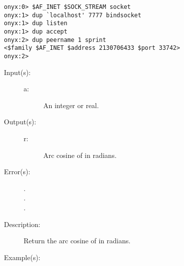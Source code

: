 \begin{description}
\begin{description}
\begin{verbatim}
onyx:0> $AF_INET $SOCK_STREAM socket
onyx:1> dup `localhost' 7777 bindsocket
onyx:1> dup listen
onyx:1> dup accept
onyx:2> dup peername 1 sprint
<$family $AF_INET $address 2130706433 $port 33742>
onyx:2>
		\end{verbatim}
	\end{description}
\label{systemdict:acos}
\item[{\onyxop{a}{acos}{r}}: ]
	\begin{description}\item[]
	\item[Input(s): ]
		\begin{description}\item[]
		\item[a: ]
			An integer or real.
		\end{description}
	\item[Output(s): ]
		\begin{description}\item[]
		\item[r: ]
			Arc cosine of  in radians.
		\end{description}
	\item[Error(s): ]
		\begin{description}\item[]
		\item[.]
		\item[.]
		\item[.]
		\end{description}
	\item[Description: ]
		Return the arc cosine of  in radians.
	\item[Example(s): ]\begin{verbatim}


\end{verbatim}
\end{description}
\end{description}

